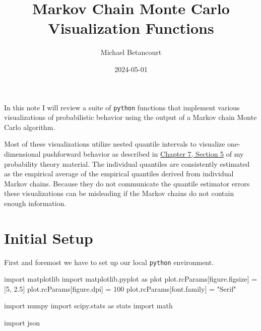 \documentclass[
  letterpaper,
  DIV=11,
  numbers=noendperiod]{scrartcl}
\title{Markov Chain Monte Carlo Visualization Functions}
\author{Michael Betancourt}
\date{2024-05-01}
\newenvironment{Shaded}{\begin{snugshade}}{\end{snugshade}}
\newcommand{\DecValTok}[1]{\textcolor[rgb]{0.68,0.00,0.00}{#1}}
\newcommand{\FloatTok}[1]{\textcolor[rgb]{0.68,0.00,0.00}{#1}}
\newcommand{\ImportTok}[1]{\textcolor[rgb]{0.00,0.46,0.62}{#1}}
\newcommand{\NormalTok}[1]{\textcolor[rgb]{0.00,0.23,0.31}{#1}}
\newcommand{\OperatorTok}[1]{\textcolor[rgb]{0.37,0.37,0.37}{#1}}
\newcommand{\StringTok}[1]{\textcolor[rgb]{0.13,0.47,0.30}{#1}}
\renewcommand*\contentsname{Table of contents}
\newcommand\contentsname{Table of contents}
\begin{document}
\maketitle

\renewcommand*\contentsname{Table of contents}
{
\hypersetup{linkcolor=}
\setcounter{tocdepth}{3}
\tableofcontents
}
In this note I will review a suite of \texttt{python} functions that
implement various visualizations of probabilistic behavior using the
output of a Markov chain Monte Carlo algorithm.

Most of these visualizations utilize nested quantile intervals to
visualize one-dimensional pushforward behavior as described in
\href{https://betanalpha.github.io/assets/chapters_html/transforming_probability_spaces.html\#sec:1d-pushforward-characterizations}{Chapter
7, Section 5} of my probability theory material. The individual
quantiles are consistently estimated as the empirical average of the
empirical quantiles derived from individual Markov chains. Because they
do not communicate the quantile estimator errors these visualizations
can be misleading if the Markov chains do not contain enough
information.

\section{Initial Setup}\label{initial-setup}

First and foremost we have to set up our local \texttt{python}
environment.

\begin{Shaded}
\begin{Highlighting}[]
\ImportTok{import}\NormalTok{ matplotlib}
\ImportTok{import}\NormalTok{ matplotlib.pyplot }\ImportTok{as}\NormalTok{ plot}
\NormalTok{plot.rcParams[}\StringTok{\textquotesingle{}figure.figsize\textquotesingle{}}\NormalTok{] }\OperatorTok{=}\NormalTok{ [}\DecValTok{5}\NormalTok{, }\FloatTok{2.5}\NormalTok{]}
\NormalTok{plot.rcParams[}\StringTok{\textquotesingle{}figure.dpi\textquotesingle{}}\NormalTok{] }\OperatorTok{=} \DecValTok{100}
\NormalTok{plot.rcParams[}\StringTok{\textquotesingle{}font.family\textquotesingle{}}\NormalTok{] }\OperatorTok{=} \StringTok{"Serif"}

\ImportTok{import}\NormalTok{ numpy}
\ImportTok{import}\NormalTok{ scipy.stats }\ImportTok{as}\NormalTok{ stats}
\ImportTok{import}\NormalTok{ math}

\ImportTok{import}\NormalTok{ json}
\end{Highlighting}
\end{Shaded}
\end{document}
